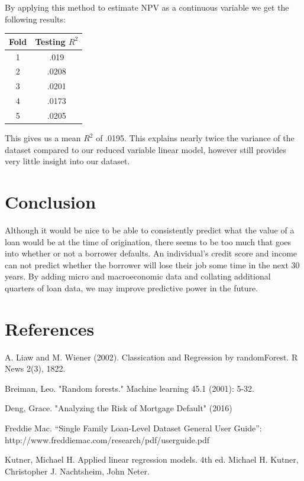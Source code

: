 \documentclass[10pt,twocolumn,letterpaper]{article}
\begin{document}
By applying this method to estimate NPV as a continuous variable we get the following results:

\begin{center}
	\begin{tabular}{ |c|c| } 
		\hline
		Fold & Testing $R^2$    \\ 
		\hline
		1 & .019  \\
		\hline
		2 & .0208  \\ 
		\hline
		3 & .0201  \\ 
		\hline
		4 & .0173  \\ 
		\hline
		5 & .0205  \\ 
		\hline
		
	\end{tabular}
\end{center}

This gives us a mean $R^2$ of .0195. This explains nearly twice the variance of the dataset compared to our reduced variable linear model, however still provides very little insight into our dataset.


\section{Conclusion}
Although it would be nice to be able to consistently predict what the value of a loan would be at the time of origination, there seems to be too much that goes into whether or not a borrower defaults. An individual's credit score and income can not predict whether the borrower will lose their job some time in the next 30 years. By adding micro and macroeconomic data and collating additional quarters of loan data, we may improve predictive power in the future.

\section{References}
A. Liaw and M. Wiener (2002). Classication and Regression by randomForest. R News 2(3), 18{22}.

Breiman, Leo. "Random forests." Machine learning 45.1 (2001): 5-32.	

Deng, Grace. "Analyzing the Risk of Mortgage Default" (2016)	

Freddie Mac. “Single Family Loan-Level Dataset General User Guide”: http://www.freddiemac.com/research/pdf/user\textunderscore guide.pdf
	
Kutner, Michael H. Applied linear regression models. {4th ed}. Michael H. Kutner, Christopher J. Nachtsheim, John Neter.
\end{document}
